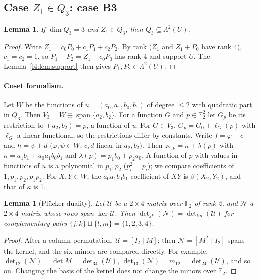 \documentclass[11pt,a4paper]{article}
\theoremstyle{plain}
\newtheorem{lemma}[theorem]{Lemma}
\theoremstyle{remark}
\newcommand{\F}{\mathbb F_2}
\newcommand{\Span}{\operatorname{span}}
\newcommand{\Lam}{\Lambda^2}
\begin{document}
\subsection[Case Z1 in Q3: case B3]{Case $Z_1\in Q_3$: case B3}

\begin{lemma}\label{l3:lem:B3U}
If $\dim Q_3=3$ and $Z_1\in Q_3$, then $Q_3\subseteq\Lam(U)$.
\end{lemma}

\begin{proof}
Write $Z_1=c_0P_0+c_1P_1+c_2P_2$. By rank ($Z_1$ and $Z_1+P_0$ have rank 4), $c_1=c_2=1$, so $P_1+P_2=Z_1+c_0P_0$ has rank 4 and support $U$. The Lemma~\ref{l4:lem:support} then gives $P_1,P_2\in\Lam(U)$.
\end{proof}

\paragraph{Coset formalism.} Let $W$ be the functions of $u=(a_0,a_1,b_0,b_1)$ of degree $\le2$ with quadratic part in $Q_3$. Then $V_3=W\oplus\Span\{a_2,b_2\}$. For a function $G$ and $p\in\F^2$ let $G_p$ be its restriction to $(a_2,b_2)=p$, a function of $u$. For $G\in V_3$, $G_p=G_0+\ell_G(p)$ with $\ell_G$ a linear functional, so the restrictions differ by constants. Write $f=\varphi+c$ and $h=\psi+d$ ($\varphi,\psi\in W$; $c,d$ linear in $a_2,b_2$). Then $z_{2,p}=\kappa+\lambda(p)$ with $\kappa=a_1b_1+a_0a_1b_0b_1$ and $\lambda(p)=p_1b_0+p_2a_0$. A function of $p$ with values in functions of $u$ is a polynomial in $p_1,p_2$ ($p_i^2=p_i$); we compare coefficients of $1,p_1,p_2,p_1p_2$. For $X,Y\in W$, the $a_0a_1b_0b_1$-coefficient of $XY$ is $\beta(X_2,Y_2)$, and that of $\kappa$ is 1.

\begin{lemma}[Pl\"ucker duality]\label{l3:lem:pl}
Let $\mathcal U$ be a $2\times4$ matrix over $\F$ of rank 2, and $\mathcal N$ a $2\times4$ matrix whose rows span $\ker\mathcal U$. Then $\det_{jk}(\mathcal N)=\det_{lm}(\mathcal U)$ for complementary pairs $\{j,k\}\sqcup\{l,m\}=\{1,2,3,4\}$.
\end{lemma}

\begin{proof}
After a column permutation, $\mathcal U=[I_2\mid M]$; then $\mathcal N=[M^{T}\mid I_2]$ spans the kernel, and the six minors are compared directly. For example, $\det_{12}(\mathcal N)=\det M=\det_{34}(\mathcal U)$, $\det_{13}(\mathcal N)=m_{12}=\det_{24}(\mathcal U)$, and so on. Changing the basis of the kernel does not change the minors over $\F$.
\end{proof}
\end{document}
